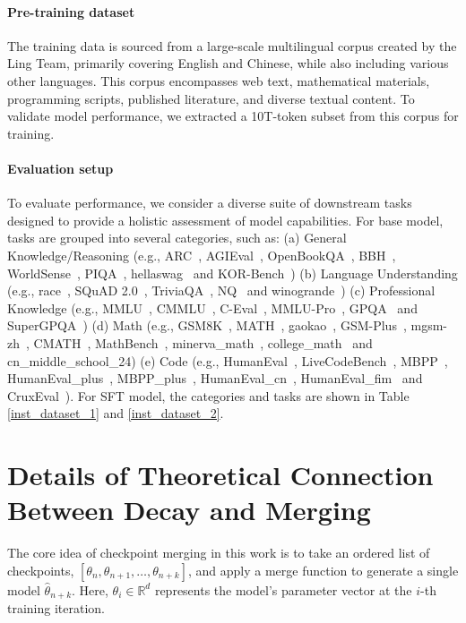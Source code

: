 \paragraph{Pre-training dataset}
The training data is sourced from a large-scale multilingual corpus created by the Ling Team, primarily covering English and Chinese, while also including various other languages. This corpus encompasses web text, mathematical materials, programming scripts, published literature, and diverse textual content. To validate model performance, we extracted a 10T-token subset from this corpus for training.




\paragraph{Evaluation setup}
\label{}
To evaluate performance, we consider a diverse suite of downstream tasks designed to provide a holistic assessment of model capabilities. For base model, tasks are grouped into several categories, such as: (a) General Knowledge/Reasoning (e.g., ARC~\citep{arc}, AGIEval~\citep{agieval}, OpenBookQA~\citep{openbookqa}, BBH~\citep{bbh}, WorldSense~\citep{worldsense}, PIQA~\citep{piqa}, hellaswag~\citep{hellaswag} and KOR-Bench~\citep{korbench}) (b) Language Understanding (e.g., race~\citep{race}, SQuAD 2.0~\citep{squad2}, TriviaQA~\citep{trivalqa}, NQ~\citep{nq} and winogrande~\citep{winogrande}) (c) Professional Knowledge (e.g., MMLU~\citep{mmlu}, CMMLU~\citep{cmmlu}, C-Eval~\citep{ceval}, MMLU-Pro~\citep{mmlu-pro}, GPQA~\citep{gpqa} and SuperGPQA~\citep{supergpqa}) (d) Math (e.g., GSM8K~\citep{gsm8k}, MATH~\citep{math}, gaokao~\citep{gaokao}, GSM-Plus~\citep{gsm-plus}, mgsm-zh~\citep{mgsm}, CMATH~\citep{cmath}, MathBench~\citep{mathbench}, minerva\_math~\citep{math}, college\_math~\citep{college-math} and cn\_middle\_school\_24) (e) Code (e.g., HumanEval~\citep{humaneval}, LiveCodeBench~\citep{livecodebench}, MBPP~\citep{mbpp}, HumanEval\_plus~\citep{mbpp+}, MBPP\_plus~\citep{mbpp+}, HumanEval\_cn~\citep{humaneval_cn}, HumanEval\_fim~\citep{fim} and CruxEval~\citep{cruxeval}). For SFT model, the categories and tasks are shown in Table \ref{inst_dataset_1} and \ref{inst_dataset_2}.    









\section{Details of Theoretical Connection Between Decay and Merging}
\label{app:Theoretical}
The core idea of checkpoint merging in this work is to take an ordered list of checkpoints, $[\theta_n, \theta_{n+1}, \dots, \theta_{n+k}]$, and apply a merge function to generate a single model $\hat{\theta}_{n+k}$. Here, $\theta_i \in \mathbb{R}^d$ represents the model's parameter vector at the $i$-th training iteration.

